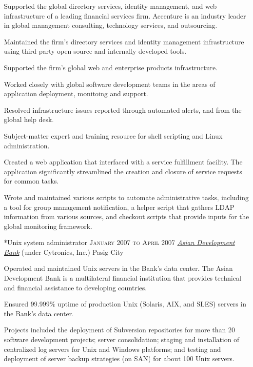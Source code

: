 \documentclass[10pt, a4paper, final]{article}
\begin{document}
\begin{section}
\begin{subsection}
    Supported the global directory services, identity management, and web infrastructure of a leading financial services firm. Accenture is an industry leader in global management consulting, technology services, and outsourcing.
    \vspace{1em}
    \begin{compactitem}
      \item Maintained the firm's directory services and identity management infrastructure using third-party open source and internally developed tools.
      \item Supported the firm's global web and enterprise products infrastructure.
      \item Worked closely with global software development teams in the areas of application deployment, monitoing and support.
      \item Resolved infrastructure issues reported through automated alerts, and from the global help desk.
      \item Subject-matter expert and training resource for shell scripting and Linux administration.
      \item Created a web application that interfaced with a service fulfillment facility. The application significantly streamlined the creation and closure of service requests for common tasks.
      \item Wrote and maintained various scripts to automate administrative tasks, including a tool for group management notification, a helper script that gathers LDAP information from various sources, and checkout scripts that provide inputs for the global monitoring framework.
      
    \end{compactitem}
  \end{subsection}
  \vspace{1.5em}

  \begin{subsection}*{Unix system administrator \hfill\textsc{January 2007 to April 2007}}
    \href{http://www.adb.org}{\textit{Asian Development Bank}} (under Cytronics, Inc.) \hfill Pasig City
    \vspace{1em}

    Operated and maintained Unix servers in the Bank's data center. The Asian Development Bank is a multilateral financial institution that provides technical and financial assistance to developing countries.
    \vspace{1em}
    \begin{compactitem}
      \item Ensured 99.999\% uptime of production Unix (Solaris, AIX, and SLES) servers in the Bank's data center.
      \item Projects included the deployment of Subversion repositories for more than 20 software development projects; server consolidation; staging and installation of centralized log servers for Unix and Windows platforms; and testing and deployment of server backup strategies (on SAN) for about 100 Unix servers.
      

\end{compactitem}
\end{subsection}
\end{section}
\end{document}
